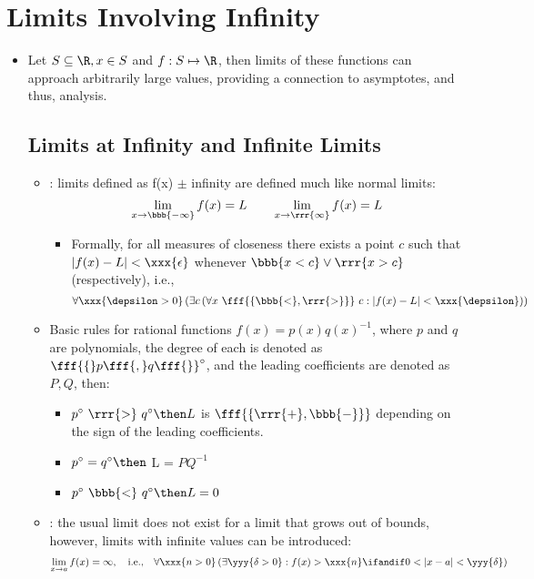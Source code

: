 \section{Limits Involving Infinity}
\begin{itemize}
  \item Let \(S \subseteq \R, x \in S\) and \(f : S \mapsto \R\), then limits of these functions can approach arbitrarily large \prn{\(\pm\)} values, providing a connection to asymptotes, and thus, analysis.
 

  \subsection{Limits at Infinity and Infinite Limits}
  \begin{itemize}
    \item {}: limits defined as f(x) \(\pm\) infinity are defined much like normal limits:
    \[%
    \lim_{x \to \bbb{-\infty}}f(x) = L 
    \qquad
    \lim_{x \to \rrr{\infty}}f(x) = L
    \]%
    \begin{itemize}
      \item Formally, for all measures of closeness \xxx{\(\epsilon\)} there exists a point \( c\) such that \(|f(x)-L| < \xxx{\epsilon}\) whenever \(\bbb{x < c} \lor \rrr{x > c}\) (respectively), i.e.,
      \[%
      \forall\xxx{\depsilon > 0} \left(
        \exists c \left(
          \forall x~\fff{\left\{\bbb{<}, \rrr{>}\right\}}~c : |f(x)-L | < \xxx{\depsilon}
          \right)
        \right)
      \]%
    \end{itemize}
    \item Basic rules for rational functions \(f(x)= p(x)q(x)^{-1}\), where \(p\) and \(q\) are polynomials, the degree of each is denoted as \(\fff{\{}p\fff{,}q\fff{\}}^\circ\), and the leading coefficients are denoted as \(P, Q\), then:
      \begin{itemize}
        \item \(p^\circ~\rrr{>}~q^\circ \then L\) is \(\fff{\{\rrr{+}, \bbb{-}\}}\) depending on the sign of the leading coefficients.
        \item \(p^\circ = q^\circ \then\) L = \(PQ^{-1}\)
        \item \(p^\circ~\bbb{<}~q^\circ \then L = 0\)
      \end{itemize}
    \item {}: the usual limit does not exist for a limit that grows out of bounds, however, limits with infinite values can be introduced:
      \[%
      \lim_{x \to a}f(x) = \infty,\quad \text{i.e.,}\quad 
      \forall \xxx{n > 0} \left(
        \exists \yyy{\delta > 0} : f(x) > \xxx{n} \ifandif 0 < | x-a | < \yyy{\delta}
      \right)
      \]%
  \end{itemize}


\end{itemize}

